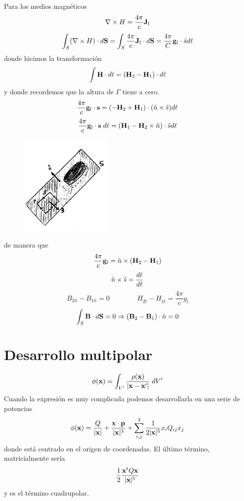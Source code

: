 \documentclass[10pt,oneside]{CBFT_book}
\begin{document}
Para los medios magnéticos
\[
	\rotorm{H} = \frac{4 \pi}{c} \vb{J}_l
\]
\[
	\int_S (\rotorm{H}) \cdot d\vb{S} = \int_S \frac{4 \pi}{c} \vb{J}_l \cdot d\vb{S} = 
	\frac{4 \pi}{C} \vb{g}_l\cdot \hat{s} d\ell
\]
donde hicimos la transformación
\[
	\int \vb{H}\cdot d\ell = (\vb{H}_2-\vb{H}_1)\cdot d\ell
\]
y donde recordemos que la altura de $\Gamma$ tiene a cero.
\[
	\frac{4 \pi}{c} \vb{g}_l \cdot \vb{s} = ( -\vb{H}_2 + \vb{H}_1 )\cdot( \hat{n} \times \hat{s} ) d\ell
\]
\[
	\frac{4 \pi}{c} \vb{g}_l \cdot \vb{s} \; d\ell = (\vb{H}_1 -\vb{H}_2 \times \hat{n})\cdot \hat{s} 
d\ell
\]

\begin{figure}[htb]
	\begin{center}
	\includegraphics[width=0.4\textwidth]{images/fig_ft1_contorno2.pdf}	 
	\end{center}
	\caption{}
\end{figure} 

de manera que 
\[
	\frac{4 \pi}{c} \vb{g}_l = \hat{n} \times ( \vb{H}_2 - \vb{H}_1 )
\]
\[
	\hat{n}\times\hat{s} = \frac{d\vb{\ell}}{d\ell} 
\]
\[
	B_{2\hat{n}} - B_{1\hat{n}} = 0 \qquad \qquad H_{2\hat{t}} - H_{1\hat{t}} = \frac{4 \pi}{c} g_l
\]
\[
	\int_S \vb{B}\cdot d\vb{S} = 0 \Rightarrow (\vb{B}_2 - \vb{B}_1 )\cdot\hat{n} = 0
\]

\section{Desarrollo multipolar}

\[
	\phi(\vb{x}) = \int_{V'} \frac{\rho(\vb{x})}{|\vb{x}-\vb{x}'|} \; dV'
\]
Cuando la expresión es muy complicada podemos desarrollarla en una serie de potencias
\[
	\phi(\vb{x}) = \frac{Q}{|\vb{x}|} + \frac{\vb{x}\cdot\vb{p}}{|\vb{x}|^3} +
	\sum_{i,j}^3 \frac{1}{2|\vb{x}|^5} x_i Q_{ij} x_j
\]
donde está centrado en el origen de coordenadas. El último término, matricialmente sería
\[
	\frac{1}{2} \frac{\vb{x}^t Q \vb{x}}{|\vb{x}|^5}
\]
y es el término cuadrupolar.
\end{document}

